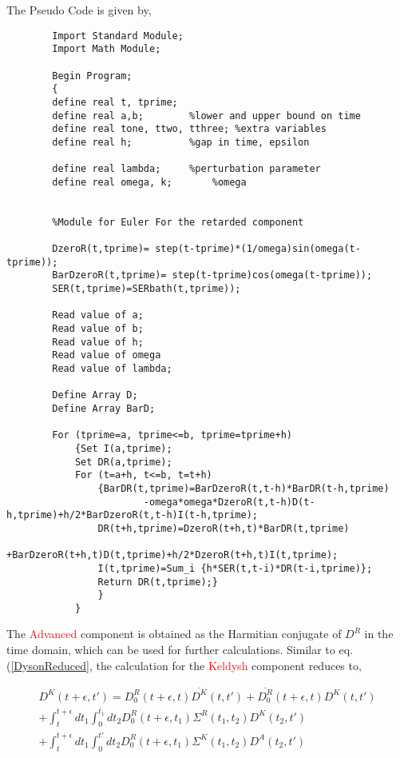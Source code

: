 \documentclass{amsart}
\begin{document}
    
    The Pseudo Code is given by,
    \par
    \begin{verbatim}
        Import Standard Module;
        Import Math Module;
        
        Begin Program;
        {
        define real t, tprime;
        define real a,b; 		%lower and upper bound on time
        define real tone, ttwo, tthree;	%extra variables
        define real h;			%gap in time, epsilon
        
        define real lambda;		%perturbation parameter
        define real omega, k;		%omega
        
        
        %Module for Euler For the retarded component
        
        DzeroR(t,tprime)= step(t-tprime)*(1/omega)sin(omega(t-tprime));
        BarDzeroR(t,tprime)= step(t-tprime)cos(omega(t-tprime));
        SER(t,tprime)=SERbath(t,tprime));
        
        Read value of a;
        Read value of b;
        Read value of h;
        Read value of omega
        Read value of lambda;
        
        Define Array D;
        Define Array BarD;
        
        For (tprime=a, tprime<=b, tprime=tprime+h)
        	{Set I(a,tprime);
        	Set DR(a,tprime);
        	For (t=a+h, t<=b, t=t+h)
        		{BarDR(t,tprime)=BarDzeroR(t,t-h)*BarDR(t-h,tprime)
        		        -omega*omega*DzeroR(t,t-h)D(t-h,tprime)+h/2*BarDzeroR(t,t-h)I(t-h,tprime);
        		DR(t+h,tprime)=DzeroR(t+h,t)*BarDR(t,tprime)
        		        +BarDzeroR(t+h,t)D(t,tprime)+h/2*DzeroR(t+h,t)I(t,tprime); 
        		I(t,tprime)=Sum_i {h*SER(t,t-i)*DR(t-i,tprime)};
                Return DR(t,tprime);}
        		}
        	}
    \end{verbatim}
    
    The \textcolor{Red}{Advanced} component is obtained as the Harmitian conjugate of $D^R$ in the time domain, which can be used for further calculations. Similar to eq. (\ref{DysonReduced}, the calculation for the \textcolor{Red}{Keldysh} component reduces to,

    \begin{multline}\label{DysonKeldyshReduced}
         D^K(t+\epsilon , t') = D^R_0(t+\epsilon , t)\overline{D^K}(t , t')+\overline{D^R_0}(t+\epsilon , t)D^K(t , t')
                         \\  + \int^{t+\epsilon}_{t} dt_1\int^{t_1}_{0} dt_2 D_0^R(t+\epsilon, t_1) \Sigma^R (t_1,t_2) D^K(t_2, t')
                         \\  + \int^{t+\epsilon}_{t} dt_1\int^{t'}_{0} dt_2 D_0^R(t+\epsilon, t_1) \Sigma^K (t_1,t_2) D^A(t_2, t')
    \end{multline}
    
\end{document}
